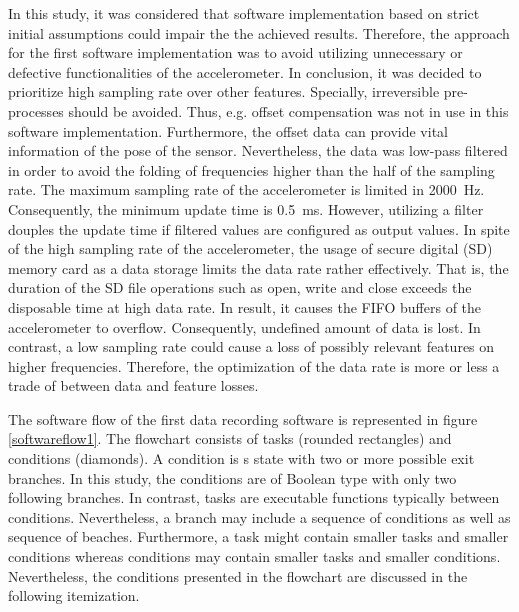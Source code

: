 \documentclass[english,12pt,a4paper,pdftex,elec,utf8]{aaltothesis}
\begin{document}
In this study, it was considered that software implementation based on strict initial assumptions could impair the the achieved results. Therefore, the approach for the first software implementation was to avoid utilizing unnecessary  or defective functionalities of the accelerometer. In conclusion, it was decided to prioritize high sampling rate over other features. Specially, irreversible pre-processes should be avoided. Thus, e.g. offset compensation was not in use in this software implementation. Furthermore, the offset data can provide vital information of the pose of the sensor. Nevertheless, the data was low-pass filtered in order to avoid the folding of frequencies higher than the half of the sampling rate. The maximum sampling rate of the accelerometer is limited in \SI{2000}{\hertz}. Consequently, the minimum update time is \SI{0.5}{\milli\second}. However, utilizing a filter douples the update time if filtered values are configured as output values. In spite of the high sampling rate of the accelerometer, the usage of secure digital (SD) memory card as a data storage limits the data rate rather effectively. That is, the duration of the SD file operations such as open, write and close exceeds the disposable time at high data rate. In result, it causes the FIFO buffers of the accelerometer to overflow. Consequently, undefined amount of data is lost. In contrast, a low sampling rate could cause a loss of possibly relevant features on higher frequencies. Therefore, the optimization of the data rate is more or less a trade of between data and feature losses.

The software flow of the first data recording software is represented in figure \ref{softwareflow1}. The flowchart consists of tasks (rounded rectangles) and conditions (diamonds). A condition is s state with two or more possible exit branches. In this study, the conditions are of Boolean type with only two following branches. In contrast, tasks are executable functions typically between conditions. Nevertheless, a branch may include a sequence of conditions as well as sequence of beaches. Furthermore, a task might contain smaller tasks and smaller conditions whereas conditions may contain smaller tasks and smaller conditions. Nevertheless, the conditions presented in the flowchart are discussed in the following itemization.
\end{document}
